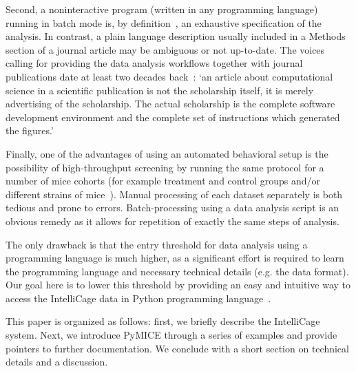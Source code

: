 Second, a noninteractive program (written in any programming language)
running in batch mode is, by 
definition~\cite{Hoare69anaxiomatic,Turing1936,Floyd1967Flowcharts,Mccarthy63abasis},
an exhaustive specification of the analysis. In contrast, a plain language
description usually included in a Methods section of a journal article
may be ambiguous or not up-to-date.
The voices calling for providing the data analysis workflows together with
journal publications date at least two decades back~\cite{buckheit1995}:
`an article about computational science in a scientific publication is not
the scholarship itself, it is merely advertising of the scholarship. The
actual scholarship is the complete software development environment and the
complete set of instructions which generated the figures.'

Finally, one of the advantages of using an automated behavioral setup 
is the possibility of high-throughput screening
by running the same protocol for a number of mice
cohorts (for example treatment and control groups and/or different strains
of mice~\cite{Puscian:2014cu}). Manual processing of each dataset separately
is both tedious and prone to errors. Batch-processing using a data
analysis script is an obvious remedy as it allows for repetition of exactly
the same steps of analysis.

The only drawback is that the entry threshold for data analysis using a
programming language is much higher, as a significant effort is required to
learn the programming language and necessary technical details (e.g. the data
format).
Our goal here is to lower this threshold by providing an easy and intuitive
way to access the IntelliCage data in Python programming language~\cite{rossum1995}.

This paper is organized as follows: first, we briefly describe the IntelliCage system.
Next, we introduce PyMICE through a series of examples and provide pointers 
to further documentation. We conclude with a short section on technical details and 
a discussion.
